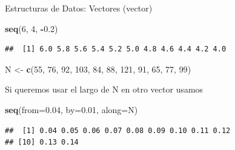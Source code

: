 \documentclass[ignorenonframetext,]{beamer}
\newenvironment{Shaded}{\begin{snugshade}}{\end{snugshade}}
\newcommand{\KeywordTok}[1]{\textcolor[rgb]{0.13,0.29,0.53}{\textbf{#1}}}
\newcommand{\DataTypeTok}[1]{\textcolor[rgb]{0.13,0.29,0.53}{#1}}
\newcommand{\DecValTok}[1]{\textcolor[rgb]{0.00,0.00,0.81}{#1}}
\newcommand{\FloatTok}[1]{\textcolor[rgb]{0.00,0.00,0.81}{#1}}
\newcommand{\StringTok}[1]{\textcolor[rgb]{0.31,0.60,0.02}{#1}}
\newcommand{\OperatorTok}[1]{\textcolor[rgb]{0.81,0.36,0.00}{\textbf{#1}}}
\newcommand{\NormalTok}[1]{#1}
\begin{document}
\begin{frame}[fragile]{Estructuras de Datos: Vectores (vector)}

\begin{Shaded}
\begin{Highlighting}[]
\KeywordTok{seq}\NormalTok{(}\DecValTok{6}\NormalTok{, }\DecValTok{4}\NormalTok{, }\OperatorTok{-}\FloatTok{0.2}\NormalTok{)}
\end{Highlighting}
\end{Shaded}

\begin{verbatim}
##  [1] 6.0 5.8 5.6 5.4 5.2 5.0 4.8 4.6 4.4 4.2 4.0
\end{verbatim}

\begin{Shaded}
\begin{Highlighting}[]
\NormalTok{N <-}\StringTok{ }\KeywordTok{c}\NormalTok{(}\DecValTok{55}\NormalTok{, }\DecValTok{76}\NormalTok{, }\DecValTok{92}\NormalTok{, }\DecValTok{103}\NormalTok{, }\DecValTok{84}\NormalTok{, }\DecValTok{88}\NormalTok{, }\DecValTok{121}\NormalTok{, }\DecValTok{91}\NormalTok{, }\DecValTok{65}\NormalTok{, }\DecValTok{77}\NormalTok{, }\DecValTok{99}\NormalTok{)}
\end{Highlighting}
\end{Shaded}

Si queremos usar el largo de N en otro vector usamos

\begin{Shaded}
\begin{Highlighting}[]
\KeywordTok{seq}\NormalTok{(}\DataTypeTok{from=}\FloatTok{0.04}\NormalTok{, }\DataTypeTok{by=}\FloatTok{0.01}\NormalTok{, }\DataTypeTok{along=}\NormalTok{N)}
\end{Highlighting}
\end{Shaded}

\begin{verbatim}
##  [1] 0.04 0.05 0.06 0.07 0.08 0.09 0.10 0.11 0.12
## [10] 0.13 0.14
\end{verbatim}

\end{frame}
\end{document}
